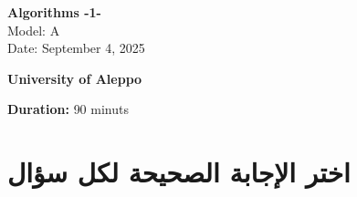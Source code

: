 \documentclass[12pt]{article}
\begin{document}
\begin{flushright}
{\Large \textbf{{\textenglish{Algorithms -1-}}}}\\[0.25em]
{\normalsize \textenglish{Model: }{\textenglish{A}}}\\[0.1em]
{\normalsize \textenglish{Date: }{\textenglish{September 4, 2025}}}
\end{flushright}

\vspace{0.6cm}

\noindent
\begin{minipage}[t]{0.65\textwidth}
  \raggedright
  \textbf{{\textenglish{University of Aleppo}}}\\[0.3em]
\end{minipage}\hfill
\begin{minipage}[t]{0.3\textwidth}
  \raggedleft
  \textenglish{\textbf{Duration: }}{\textenglish{90 minuts}}
\end{minipage}

\vspace{0.9cm}

\section*{اختر الإجابة الصحيحة لكل سؤال}
\end{document}
